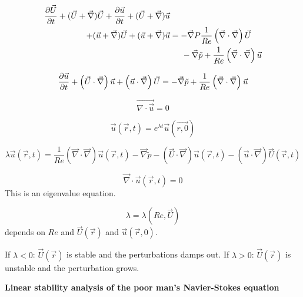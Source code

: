 \begin{align}
\begin{split}
\frac{\partial \vec{U}}{\partial t}+(\vec{U}+\vec{\nabla})\vec{U}+\frac{\partial \vec{u}}{\partial t}+(\vec{U}+\vec{\nabla})\vec{u}& \\
+ (\vec{u}+\vec{\nabla})\vec{U} + (\vec{u}+\vec{\nabla})\vec{u} &= -\vec{\nabla}P\frac{1}{Re}\left(\vec{\nabla}\cdot\vec\nabla\right)\vec{U} \\
&\hspace{5mm}-\vec{\nabla}\tilde{p}+\frac{1}{Re}\left(\vec{\nabla}\cdot\vec\nabla\right)\vec{u}
\end{split}
\end{align}


\begin{equation}
\frac{\partial \vec{u}}{\partial t}+\left(\vec{U}\cdot\vec\nabla\right)\vec{u}+\left(\vec{u}\cdot\vec\nabla\right)\vec{U} = -\vec{\nabla}\tilde{p}+\frac{1}{Re}\left(\vec{\nabla}\cdot\vec\nabla\right)\vec{u}
\end{equation}

\begin{equation}
\vec{\nabla\cdot\vec{u}}=0
\end{equation}

\begin{equation}
\vec{u}(\vec{r},t)=e^{\lambda t}\vec{u}(\vec{r,0})
\end{equation}

\begin{equation}
\lambda\vec{u}(\vec{r},t) = \frac{1}{Re}\left(\vec{\nabla}\cdot\vec\nabla\right)\vec{u}(\vec{r},t)-\vec{\nabla}\tilde{p}-\left(\vec{U}\cdot\vec\nabla\right)\vec{u}(\vec{r},t)-\left(\vec{u}\cdot\vec\nabla\right)\vec{U}(\vec{r},t)
\end{equation}

\begin{equation}
\vec{\nabla}\cdot\vec{u}(\vec{r},t) = 0
\end{equation}
This is an eigenvalue equation.

\begin{equation}
\lambda = \lambda(Re, \vec{U})
\end{equation}
depends on $Re$ and $\vec{U}(\vec{r})$ and $\vec{u}(\vec{r},0)$.

If $\lambda<0$: $\vec{U}(\vec{r})$ is stable and the perturbations damps out. If $\lambda>0$: $\vec{U}(\vec{r})$ is unstable and the perturbation grows.


\textbf{Linear stability analysis of the poor man's Navier-Stokes equation}

